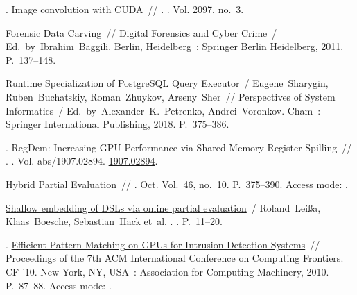 \begin{thebibliography}{10}
  . Image convolution with CUDA~// . \BibDash
  . \BibDash
  \newblock Vol. 2097, no.~3.
  
   Forensic Data Carving~// Digital
    Forensics and Cyber Crime~/ Ed.\ by\ Ibrahim~Baggili. \BibDash
  \newblock Berlin, Heidelberg~: Springer Berlin Heidelberg, 2011. \BibDash
  \newblock P.~137--148.
  
  Runtime Specialization of PostgreSQL Query Executor~/ Eugene~Sharygin,
    Ruben~Buchatskiy, Roman~Zhuykov, Arseny~Sher~// Perspectives of System
    Informatics~/ Ed.\ by\ Alexander~K.~Petrenko, Andrei~Voronkov. \BibDash
  \newblock Cham~: Springer International Publishing, 2018. \BibDash
  \newblock P.~375--386.
  
  . RegDem: Increasing
    {GPU} Performance via Shared Memory Register Spilling~// .
    \BibDash
  . \BibDash
  \newblock Vol. abs/1907.02894. \BibDash
  \newblock \href{http://arxiv.org/abs/1907.02894}{1907.02894}.
  
   Hybrid Partial Evaluation~//
    \href{http://dx.doi.org/10.1145/2076021.2048098}{}
    \BibDash
  . \BibDash Oct. \BibDash
  \newblock Vol.~46, no.~10. \BibDash
  \newblock P.~375–390. \BibDash
  \newblock Access mode: .
  
  \href{http://dx.doi.org/10.1145/2814204.2814208}{Shallow embedding of DSLs via
    online partial evaluation}~/ Roland~Leißa, Klaas~Boesche, Sebastian~Hack
    et~al. \BibDash
  . . \BibDash
  \newblock P.~11--20.
  
  .
    \href{http://dx.doi.org/10.1145/1787275.1787296}{Efficient Pattern Matching
    on GPUs for Intrusion Detection Systems}~// Proceedings of the 7th ACM
    International Conference on Computing Frontiers. \BibDash
  \newblock CF ’10. \BibDash
  \newblock New York, NY, USA~: Association for Computing Machinery, 2010.
    \BibDash
  \newblock P.~87–88. \BibDash
  \newblock Access mode: .
  

\end{thebibliography}

